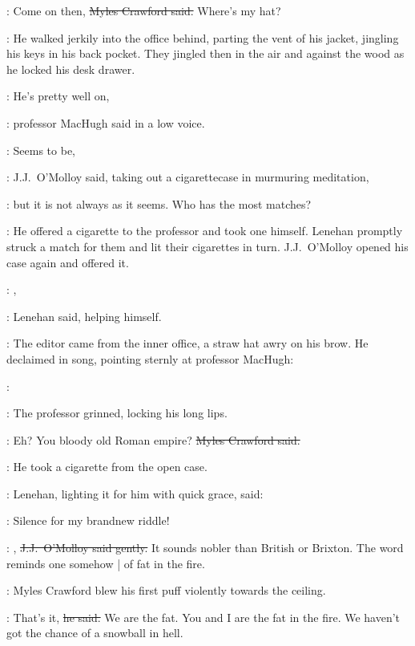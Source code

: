 \crawford:
Come on then,
\sout{Myles Crawford said.}
Where's my hat?

:
He walked jerkily into the office behind,
parting the vent of his jacket,
jingling his keys in his back pocket.
They jingled then in the air and against the wood
as he locked his desk drawer.

\machugh:
He's pretty well on,

:
professor MacHugh said in a low voice.

\jjom:
Seems to be,

:
J.J.~O'Molloy said,
taking out a cigarettecase in murmuring meditation,

\jjom:
but it is not always as it seems.
Who has the most matches?



:
He offered a cigarette to the professor and took one himself.
Lenehan promptly struck a match for them and lit their cigarettes in turn.
J.J.~O'Molloy opened his case again and offered it.

\lenehan:
,

:
Lenehan said,
helping himself.

:
The editor came from the inner office,
a straw hat awry on his brow.
He declaimed in song,
pointing sternly at professor MacHugh:

\crawford:

:
The professor grinned,
locking his long lips.

\crawford:
Eh?
You bloody old Roman empire?
\sout{Myles Crawford said.}

:
He took a cigarette from the open case.

:
Lenehan,
lighting it for him with quick grace,
said:

\lenehan:
Silence for my brandnew riddle!

\jjom:
,
\sout{J.J.~O'Molloy said gently.}
It sounds nobler than British or Brixton.
The word reminds one somehow |
of fat in the fire.

:
Myles Crawford blew his first puff
violently towards the ceiling.

\crawford:
That's it,
\sout{he said.}
We are the fat.
You and I are the fat in the fire.
We haven't got the chance of a snowball in hell.


